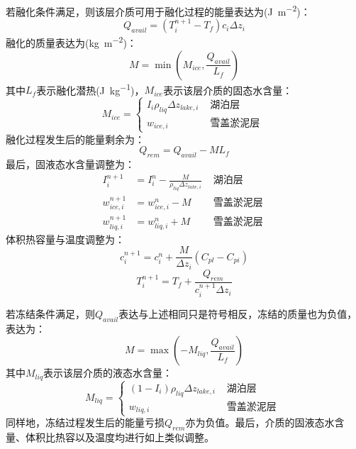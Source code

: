 若融化条件满足，则该层介质可用于融化过程的能量表达为(\unit{J.m^{-2}})：
\begin{equation}
Q_{avail}=\left(T_{i}^{n+1}-T_{f}\right) c_{i} \Delta z_{i}
\end{equation}
融化的质量表达为(\unit{kg.m^{-2}})：
\begin{equation}
M=\min \left(M_{ice}, \frac{Q_{a v a i l}}{L_{f}}\right)
\end{equation}
其中$L_f$表示融化潜热(\unit{J.kg^{-1}})，$M_{ice}$表示该层介质的固态水含量：
\begin{equation}
M_{ice}=\left\{\begin{array}{lr}I_{i} \rho_{liq} \Delta z_{lake, i} & 
    \text { 湖泊层 } \\ w_{ice, i} & \text { 雪盖淤泥层 }\end{array}\right.
\end{equation}
融化过程发生后的能量剩余为：
\begin{equation}
Q_{rem}=Q_{avail}-M L_{f}
\end{equation}
最后，固液态水含量调整为：
\begin{equation}
\begin{aligned}
I_{i}^{n+1} &=I_{i}^{n}-\frac{M}{\rho_{liq} \Delta z_{lake, i}} & \text { 湖泊层 } \\
w_{ice, i}^{n+1} &=w_{ice, i}^{n}-M & \text { 雪盖淤泥层 } \\ 
w_{liq, i}^{n+1} &=w_{liq, i}^{n}+M & \text { 雪盖淤泥层 }
\end{aligned}
\end{equation}
体积热容量与温度调整为：
\begin{equation}
c_{i}^{n+1}=c_{i}^{n}+\frac{M}{\Delta z_{i}}\left(C_{p l}-C_{p i}\right)
\end{equation}
\begin{equation}
T_{i}^{n+1}=T_{f}+\frac{Q_{rem}}{c_{i}^{n+1} \Delta z_{i}}
\end{equation}

若冻结条件满足，则$Q_{avail}$表达与上述相同只是符号相反，冻结的质量也为负值，表达为：
\begin{equation}
M=\max \left(-M_{liq}, \frac{Q_{avail}}{L_{f}}\right)
\end{equation}
其中$M_{liq}$表示该层介质的液态水含量：
\begin{equation}
M_{liq}=\left\{\begin{array}{cc}\left(1-I_{i}\right) \rho_{liq} \Delta z_{lake, i} & \text { 湖泊层 } \\
     w_{liq, i} & \text { 雪盖淤泥层 }\end{array}\right.
\end{equation}
同样地，冻结过程发生后的能量亏损$Q_{rem}$亦为负值。最后，介质的固液态水含量、体积比热容以及温度均进行如上类似调整。


